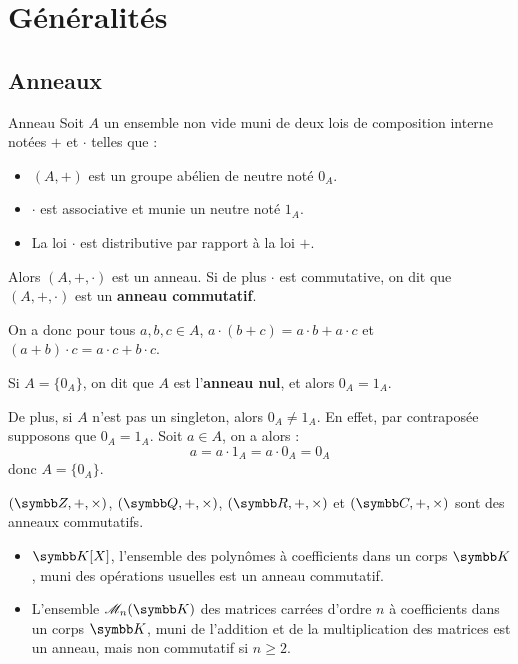 \section{Généralités}
\subsection{Anneaux}

\begin{definition}{Anneau}{}
    Soit $A$ un ensemble non vide muni de deux lois de composition interne notées $+$ et
    $\cdot$ telles que : 
    \begin{itemize}
        \item $(A, +)$ est un groupe abélien de neutre noté $0_A$.
        \item $\cdot$ est associative et munie un neutre noté $1_A$.
        \item La loi $\cdot$ est distributive par rapport à la loi $+$.
    \end{itemize}
    Alors $(A,+,\cdot)$ est un anneau. Si de plus $\cdot$ est commutative, on dit que $(A, +, \cdot)$ est un \textbf{anneau commutatif}.
\end{definition}

\begin{remarque}
    On a donc pour tous $a, b, c \in A$, $a \cdot (b + c) = a \cdot b + a \cdot c$ et 
    $(a + b) \cdot c = a \cdot c + b \cdot c$.
\end{remarque}

\begin{remarque}
    Si $A = \{0_A\}$, on dit que $A$ est l'\textbf{anneau nul}, et 
    alors $0_A = 1_A$.

    De plus, si $A$ n'est pas un singleton, alors $0_A \neq 1_A$. En effet, 
    par contraposée supposons que $0_A = 1_A$. Soit $a \in A$, on a alors :
    \[a = a \cdot 1_A = a \cdot 0_A = 0_A\]
    donc $A = \{0_A\}$.
\end{remarque}

\begin{exemple}
$(\Z, +,\times)$, $(\Q,+,\times)$, $(\R, +, \times)$ et $(\C, +, \times)$ sont des anneaux commutatifs.
\end{exemple}

\begin{exemple}
    \begin{itemize}
        \item $\K[X]$, l'ensemble des polynômes à coefficients dans un corps $\K$, muni des opérations usuelles est un anneau commutatif.
        \item L'ensemble $\mathscr M_n(\K)$ des matrices carrées d'ordre $n$ à coefficients dans un corps $\K$, muni de l'addition et de la multiplication des matrices est un anneau, mais non commutatif si $n \geqslant 2$.
    \end{itemize}
\end{exemple}

